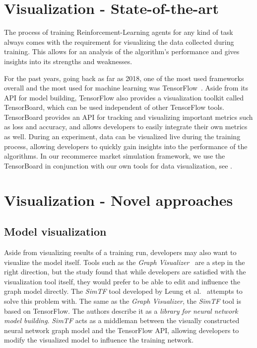 \section*{Visualization - State-of-the-art}

The process of training Reinforcement-Learning agents for any kind of task always comes with the requirement for visualizing the data collected during training. This allows for an analysis of the algorithm's performance and gives insights into its strengths and weaknesses.

For the past years, going back as far as 2018, one of the most used frameworks overall and the most used for machine learning was TensorFlow~\cite{StackOverflowSurvey}. Aside from its API for model building, TensorFlow also provides a visualization toolkit called TensorBoard, which can be used independent of other TensorFlow tools. TensorBoard provides an API for tracking and visualizing important metrics such as loss and accuracy, and allows developers to easily integrate their own metrics as well. During an experiment, data can be visualized live during the training process, allowing developers to quickly gain insights into the performance of the algorithms. In our recommerce market simulation framework, we use the TensorBoard in conjunction with our own tools for data visualization, see .

\section*{Visualization - Novel approaches}

\subsection*{Model visualization}

Aside from visualizing results of a training run, developers may also want to visualize the model itself. Tools such as the \emph{Graph Visualizer}~\cite{GraphVisualizer} are a step in the right direction, but the study found that while developers are satisfied with the visualization tool itself, they would prefer to be able to edit and influence the graph model directly. The \emph{SimTF} tool developed by Leung et al.~\cite{NeuralNetworkVisualization} attempts to solve this problem with. The same as the \emph{Graph Visualizer}, the \emph{SimTF} tool is based on TensorFlow. The authors describe it as a \emph{library for neural network model building}. \emph{SimTF} acts as a middleman between the visually constructed neural network graph model and the TensorFlow API, allowing developers to modify the visualized model to influence the training network.

